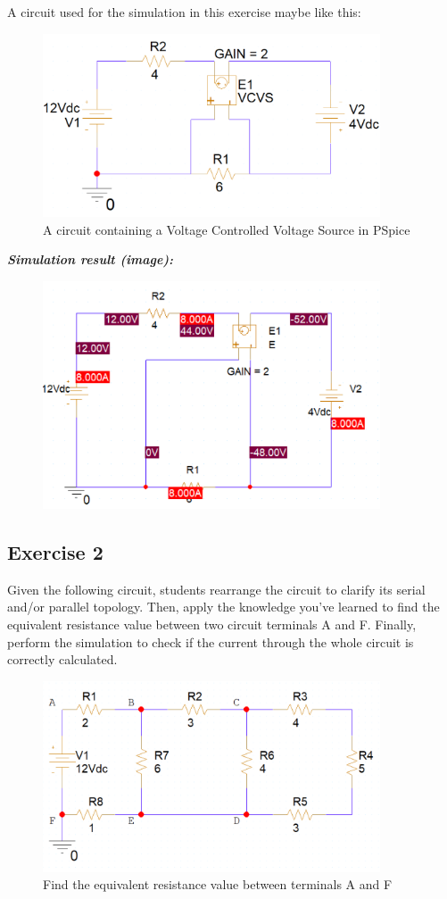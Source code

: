 A circuit used for the simulation in this exercise maybe like this:
\begin{figure}[H]
    \centering
    \includegraphics[width = 10cm]{source/picture/bai_1/Bai1_ps.png}
    \caption{A circuit containing a Voltage Controlled Voltage Source in PSpice}
\end{figure}

\textit{\textbf{Simulation result (image):}}
\begin{figure}[H]
    \centering
    \includegraphics[width = 10cm]{source/picture/bai_1/ex1.png}
\end{figure}
\newpage

\subsection{Exercise 2}
Given the following circuit, students rearrange the circuit to clarify its serial and/or parallel topology. Then, apply the knowledge you've learned to find the equivalent resistance value between two circuit terminals A and F. Finally, perform the simulation to check if the current through the whole circuit is correctly calculated.

\begin{figure}[H]
    \centering
    \includegraphics[width = 10cm]{source/picture/bai_1/Bai2_de.png}
    \caption{Find the equivalent resistance value between terminals A and F}
    \label{lab1_ex2_de}
\end{figure}

